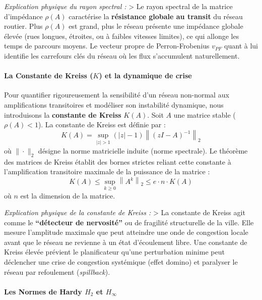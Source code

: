 \documentclass[10pt, a4paper]{article}
\begin{document}
\emph{Explication physique du rayon spectral :} \textgreater{} Le rayon
spectral de la matrice d'impédance \(\rho(A)\) caractérise la
\textbf{résistance globale au transit} du réseau routier. Plus
\(\rho(A)\) est grand, plus le réseau présente une impédance globale
élevée (rues longues, étroites, ou à faibles vitesses limites), ce qui
allonge les temps de parcours moyens. Le vecteur propre de
Perron-Frobenius \(v_{PF}\) quant à lui identifie les carrefours clés du
réseau où les flux s'accumulent naturellement.

\paragraph{\texorpdfstring{La Constante de Kreiss (\(K\)) et la
dynamique de
crise}{La Constante de Kreiss (K) et la dynamique de crise}}\label{la-constante-de-kreiss-k-et-la-dynamique-de-crise}

Pour quantifier rigoureusement la sensibilité d'un réseau non-normal aux
amplifications transitoires et modéliser son instabilité dynamique, nous
introduisons la \textbf{constante de Kreiss} \(K(A)\). Soit \(A\) une
matrice stable (\(\rho(A) < 1\)). La constante de Kreiss est définie par
: \[K(A) = \sup_{|z| > 1} (|z| - 1) \left\| (zI - A)^{-1} \right\|_2\]
où \(\|\cdot\|_2\) désigne la norme matricielle induite (norme
spectrale). Le théorème des matrices de Kreiss établit des bornes
strictes reliant cette constante à l'amplification transitoire maximale
de la puissance de la matrice :
\[K(A) \le \sup_{k \ge 0} \left\| A^k \right\|_2 \le e \cdot n \cdot K(A)\]
où \(n\) est la dimension de la matrice.

\emph{Explication physique de la constante de Kreiss :} \textgreater{}
La constante de Kreiss agit comme le \textbf{``détecteur de nervosité''}
ou de fragilité structurelle de la ville. Elle mesure l'amplitude
maximale que peut atteindre une onde de congestion locale avant que le
réseau ne revienne à un état d'écoulement libre. Une constante de Kreiss
élevée prévient le planificateur qu'une perturbation minime peut
déclencher une crise de congestion systémique (effet domino) et
paralyser le réseau par refoulement (\emph{spillback}).

\paragraph{\texorpdfstring{Les Normes de Hardy \(H_2\) et
\(H_\infty\)}{Les Normes de Hardy H\_2 et H\_\textbackslash infty}}\label{les-normes-de-hardy-h_2-et-h_infty}
\end{document}
